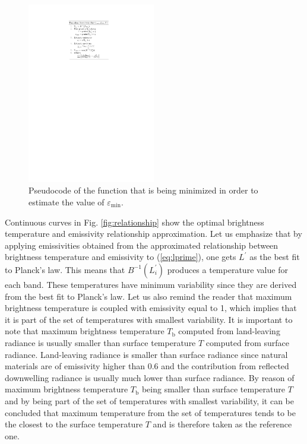 \begin{figure}[!t]
\centering
\includegraphics[width=2.2in]{pics/Chapter_03/pivov8.pdf}
\vspace{1.5 em}
\caption{Pseudocode of the function that is being minimized in order to estimate the value of $\varepsilon_\mathrm{min}$.}
\label{fig:FunctionCode}
\end{figure}

Continuous curves in Fig. \ref{fig:relationship} show the optimal brightness temperature and emissivity relationship approximation.  {
Let us emphasize that by applying emissivities obtained from the approximated relationship between brightness temperature and emissivity to (\ref{eq:lprime}), one gets $L^\prime$ as the best fit to Planck's law. This means that $B^{-1}(L^\prime_i)$ produces a temperature value for each band. These temperatures have minimum variability since they are derived from the best fit to Planck's law. Let us also remind the reader that maximum brightness temperature is coupled with emissivity equal to 1, which implies that it is part of the set of temperatures with smallest variability. It is important to note that maximum brightness temperature $T_\mathrm{b}$ computed from land-leaving radiance is usually smaller than surface temperature $T$ computed from surface radiance. Land-leaving radiance is smaller than surface radiance since natural materials are of emissivity higher than $0.6$ and the contribution from reflected downwelling radiance is usually much lower than surface radiance. By reason of maximum brightness temperature $T_\mathrm{b}$ being smaller than surface temperature $T$ and by being part of the set of temperatures with smallest variability, it can be concluded that maximum temperature from the set of temperatures tends to be the closest to the surface temperature $T$ and is therefore taken as the reference one.}


